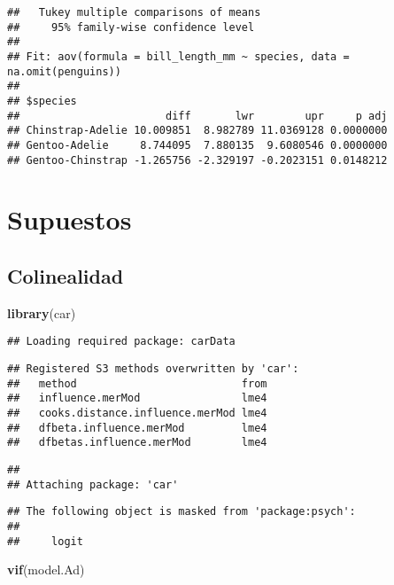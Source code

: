 \documentclass[
]{book}
\newenvironment{Shaded}{\begin{snugshade}}{\end{snugshade}}
\newcommand{\KeywordTok}[1]{\textcolor[rgb]{0.13,0.29,0.53}{\textbf{#1}}}
\newcommand{\NormalTok}[1]{#1}
\begin{document}
\begin{verbatim}
##   Tukey multiple comparisons of means
##     95% family-wise confidence level
## 
## Fit: aov(formula = bill_length_mm ~ species, data = na.omit(penguins))
## 
## $species
##                       diff       lwr        upr     p adj
## Chinstrap-Adelie 10.009851  8.982789 11.0369128 0.0000000
## Gentoo-Adelie     8.744095  7.880135  9.6080546 0.0000000
## Gentoo-Chinstrap -1.265756 -2.329197 -0.2023151 0.0148212
\end{verbatim}

\hypertarget{supuestos}{%
\section{Supuestos}\label{supuestos}}

\hypertarget{colinealidad}{%
\subsection{Colinealidad}\label{colinealidad}}

\begin{Shaded}
\begin{Highlighting}[]
\KeywordTok{library}\NormalTok{(car)}
\end{Highlighting}
\end{Shaded}

\begin{verbatim}
## Loading required package: carData
\end{verbatim}

\begin{verbatim}
## Registered S3 methods overwritten by 'car':
##   method                          from
##   influence.merMod                lme4
##   cooks.distance.influence.merMod lme4
##   dfbeta.influence.merMod         lme4
##   dfbetas.influence.merMod        lme4
\end{verbatim}

\begin{verbatim}
## 
## Attaching package: 'car'
\end{verbatim}

\begin{verbatim}
## The following object is masked from 'package:psych':
## 
##     logit
\end{verbatim}

\begin{Shaded}
\begin{Highlighting}[]
\KeywordTok{vif}\NormalTok{(model.Ad)}
\end{Highlighting}
\end{Shaded}
\end{document}
